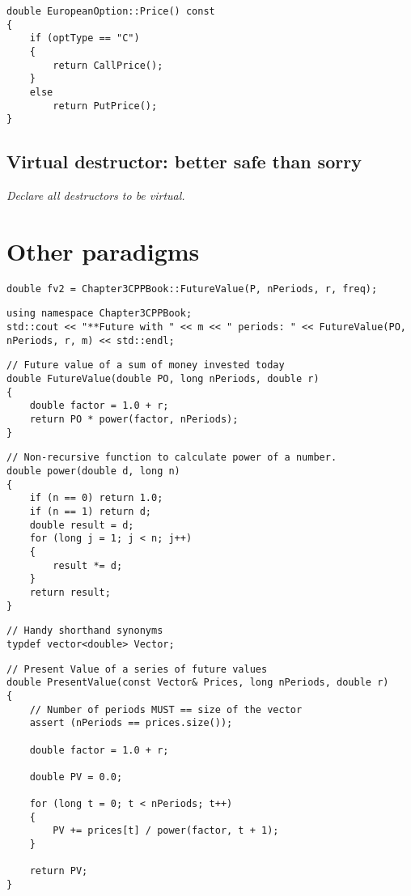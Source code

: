\begin{lstlisting}
double EuropeanOption::Price() const
{
	if (optType == "C")
	{
		return CallPrice();
	}
	else
		return PutPrice();
}
\end{lstlisting}

\subsection{Virtual destructor: better safe than sorry}

\begin{center}\itshape
Declare all destructors to be virtual.
\end{center}

\section{Other paradigms}



\begin{lstlisting}
double fv2 = Chapter3CPPBook::FutureValue(P, nPeriods, r, freq);
\end{lstlisting}

\begin{lstlisting}
using namespace Chapter3CPPBook;
std::cout << "**Future with " << m << " periods: " << FutureValue(PO, nPeriods, r, m) << std::endl;
\end{lstlisting}

\begin{lstlisting}
// Future value of a sum of money invested today
double FutureValue(double PO, long nPeriods, double r)
{
	double factor = 1.0 + r;
	return PO * power(factor, nPeriods);
}
\end{lstlisting}

\begin{lstlisting}
// Non-recursive function to calculate power of a number.
double power(double d, long n)
{
	if (n == 0) return 1.0;
	if (n == 1) return d;
	double result = d;
	for (long j = 1; j < n; j++)
	{
		result *= d;
	}
	return result;
}
\end{lstlisting}

\begin{lstlisting}
// Handy shorthand synonyms
typdef vector<double> Vector;
\end{lstlisting}

\begin{lstlisting}
// Present Value of a series of future values
double PresentValue(const Vector& Prices, long nPeriods, double r)
{
	// Number of periods MUST == size of the vector
	assert (nPeriods == prices.size());

	double factor = 1.0 + r;

	double PV = 0.0;

	for (long t = 0; t < nPeriods; t++)
	{
		PV += prices[t] / power(factor, t + 1);
	}

	return PV;
}
\end{lstlisting}

